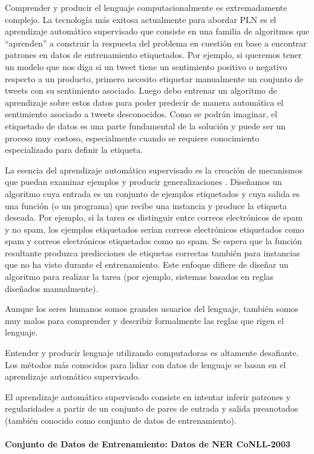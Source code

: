 Comprender y producir el lenguaje computacionalmente es extremadamente complejo.  La tecnología más exitosa actualmente para abordar PLN es el aprendizaje automático supervisado que consiste en una familia de algoritmos que “aprenden” a construir la respuesta del problema en cuestión en base a encontrar patrones en datos de entrenamiento etiquetados. Por ejemplo, si queremos tener un modelo que nos diga si un tweet tiene un sentimiento positivo o negativo respecto a un producto, primero necesito  etiquetar manualmente un conjunto de tweets con su sentimiento asociado. Luego debo entrenar un algoritmo de aprendizaje sobre estos datos para poder predecir de manera automática el sentimiento asociado a tweets desconocidos. Como se podrán imaginar, el etiquetado de datos es una parte fundamental de la solución y puede ser un proceso muy costoso, especialmente cuando se requiere conocimiento especializado para definir la etiqueta.

La esencia del aprendizaje automático supervisado es la creación de mecanismos que puedan examinar ejemplos y producir generalizaciones \cite{goldberg2017neural}. Diseñamos un algoritmo cuya entrada es un conjunto de ejemplos etiquetados y cuya salida es una función (o un programa) que recibe una instancia y produce la etiqueta deseada. Por ejemplo, si la tarea es distinguir entre correos electrónicos de spam y no spam, los ejemplos etiquetados serían correos electrónicos etiquetados como spam y correos electrónicos etiquetados como no spam. Se espera que la función resultante produzca predicciones de etiquetas correctas también para instancias que no ha visto durante el entrenamiento. Este enfoque difiere de diseñar un algoritmo para realizar la tarea (por ejemplo, sistemas basados en reglas diseñados manualmente).



Aunque los seres humanos somos grandes usuarios del lenguaje, también somos muy malos para comprender y describir formalmente las reglas que rigen el lenguaje.

Entender y producir lenguaje utilizando computadoras es altamente desafiante. Los métodos más conocidos para lidiar con datos de lenguaje se basan en el aprendizaje automático supervisado.

El aprendizaje automático supervisado consiste en intentar inferir patrones y regularidades a partir de un conjunto de pares de entrada y salida preanotados (también conocido como conjunto de datos de entrenamiento).

\paragraph{Conjunto de Datos de Entrenamiento: Datos de NER CoNLL-2003}

